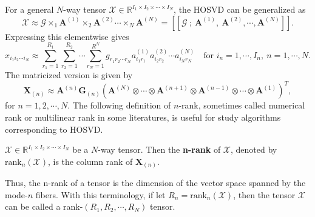 \documentclass[preprint]{elsarticle}
\begin{document}
\vskip 0.3cm
\noindent For a general $N$-way tensor $\boldsymbol{\mathscr{X}}\in\mathbb{R}^{I_1\times I_2\times\cdots\times I_N}$, the
HOSVD can be generalized as
\begin{equation}
    \boldsymbol{\mathscr{X}}\approx \boldsymbol{\mathscr{G}}\times_1\mathbf{A}^{(1)}\times_2\mathbf{A}^{(2)}\cdots\times_N\mathbf{A}^{(N)}
    = [\![\boldsymbol{\mathscr{G}}\ ; \ \mathbf{A}^{(1)}, \ \mathbf{A}^{(2)}, \cdots, \mathbf{A}^{(N)}]\!].
\end{equation}
Expressing this elementwise gives
\begin{equation}
    x_{i_1i_2\cdots i_N}\approx\sum_{r_1=1}^{R_1}\sum_{r_2=1}^{R_2}\cdots\sum_{r_N=1}^{R^N} g_{r_1r_2\cdots r_N}a_{i_1r_1}^{(1)} a_{i_2r_2}^{(2)}\cdots 
    a_{i_Nr_N}^{(N)} \quad \text{for } i_n=1,\cdots,I_n, \ n=1,\cdots,N.
\end{equation}
The matricized version is given by
\begin{equation}
    \mathbf{X}_{(n)}\approx \mathbf{A}^{(n)}\mathbf{G}_{(n)}\left(\mathbf{A}^{(N)}\otimes\cdots\otimes\mathbf{A}^{(n+1)}
    \otimes\mathbf{A}^{(n-1)}\otimes\cdots\otimes\mathbf{A}^{(1)}\right)^T,
\end{equation}
for $n=1,2,\cdots, N$.
\vskip 0.3cm
\noindent The following definition of $n$-rank, sometimes called numerical rank or multilinear rank in some literatures, is useful for study algorithms
corresponding to HOSVD.
\begin{defn}[n-rank]
    $\boldsymbol{\mathscr{X}}\in\mathbb{R}^{I_1\times I_2\times\cdots\times I_N}$ be a $N$-way tensor. Then the \textbf{n-rank}
    of $\boldsymbol{\mathscr{X}}$, denoted by $\text{rank}_n(\boldsymbol{\mathscr{X}})$, is the column rank of $\mathbf{X}_{(n)}$.
\end{defn}
Thus, the n-rank of a tensor is the dimension of the vector space spanned by the mode-$n$ fibers. With this terminology,
if let $R_n = \text{rank}_n(\boldsymbol{\mathscr{X}})$, then the tensor $\boldsymbol{\mathscr{X}}$ can be called a
rank-$(R_1,R_2,\cdots,R_N)$ tensor.
\end{document}
